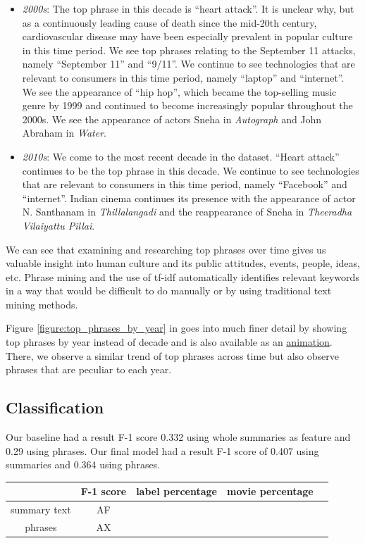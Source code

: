 \documentclass{article}
\begin{document}
\begin{multicols}{2}
\begin{itemize}
    \item \textit{2000s}: The top phrase in this decade is ``heart attack''. It is unclear why, but as a continuously leading cause of death since the mid-20th century, cardiovascular disease may have been especially prevalent in popular culture in this time period. We see top phrases relating to the September 11 attacks, namely ``September 11'' and ``9/11''. We continue to see technologies that are relevant to consumers in this time period, namely ``laptop'' and ``internet''. We see the appearance of ``hip hop'', which became the top-selling music genre by 1999 and continued to become increasingly popular throughout the 2000s. We see the appearance of actors Sneha in \textit{Autograph} and John Abraham in \textit{Water}.
    \item \textit{2010s}: We come to the most recent decade in the dataset. ``Heart attack'' continues to be the top phrase in this decade. We continue to see technologies that are relevant to consumers in this time period, namely ``Facebook'' and ``internet''. Indian cinema continues its presence with the appearance of actor N. Santhanam in \textit{Thillalangadi} and the reappearance of Sneha in \textit{Theeradha Vilaiyattu Pillai}.
\end{itemize}

We can see that examining and researching top phrases over time gives us valuable insight into human culture and its public attitudes, events, people, ideas, etc. Phrase mining and the use of tf-idf automatically identifies relevant keywords in a way that would be difficult to do manually or by using traditional text mining methods.

Figure \ref{figure:top_phrases_by_year} in  goes into much finer detail by showing top phrases by year instead of decade and is also available as an \href{https://www.youtube.com/watch?v=8aOob6iJO5Y}{animation}. There, we observe a similar trend of top phrases across time but also observe phrases that are peculiar to each year.

\subsection{Classification}
Our baseline had a result F-1 score 0.332 using whole summaries as feature and 0.29 using phrases. Our final model had a result F-1 score of 0.407 using summaries and 0.364 using phrases.
\begin{table}
\centering
\begin{tabular}{|c|c|c|c|c}
\hline
& F-1 score & label percentage & movie percentage \\
\hline
 summary text & AF \\
 phrases & AX \\


\end{tabular}
\end{table}
\end{multicols}
\end{document}
